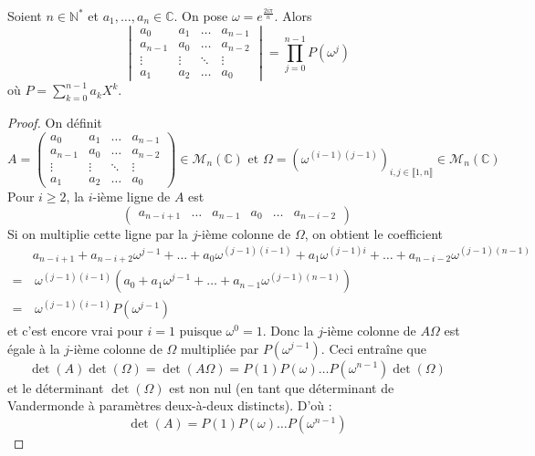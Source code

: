 






	\begin{lemma}
		\label{suite-de-polygones-1}
		Soient $n \in \mathbb{N}^*$ et $a_1, \dots, a_n \in \mathbb{C}$. On pose $\omega = e^{\frac{2i\pi}{n}}$. Alors
		\[ \begin{vmatrix} a_0 & a_1 & \dots & a_{n-1} \\ a_{n-1} & a_0 & \dots & a_{n-2}\\ \vdots & \vdots & \ddots & \vdots \\ a_1 & a_2 & \dots & a_0 \end{vmatrix} = \prod_{j=0}^{n-1} P(\omega^j) \]
		où $P = \sum_{k=0}^{n-1} a_k X^k$.
	\end{lemma}

	\begin{proof}
		On définit
		\[ A = \begin{pmatrix} a_0 & a_1 & \dots & a_{n-1} \\ a_{n-1} & a_0 & \dots & a_{n-2}\\ \vdots & \vdots & \ddots & \vdots \\ a_1 & a_2 & \dots & a_0 \end{pmatrix} \in \mathcal{M}_n(\mathbb{C}) \text{ et } \Omega = (\omega^{(i-1)(j-1)})_{i, j \in \llbracket 1, n \rrbracket} \in \mathcal{M}_n(\mathbb{C}) \]
		Pour $i \geq 2$, la $i$-ième ligne de $A$ est
		\[ \begin{pmatrix} a_{n-i+1} & \dots & a_{n-1} & a_0 & \dots & a_{n-i-2} \end{pmatrix} \]
		Si on multiplie cette ligne par la $j$-ième colonne de $\Omega$, on obtient le coefficient
		\begin{align*}
			&a_{n-i+1} + a_{n-i+2} \omega^{j-1} + \dots + a_0 \omega^{(j-1)(i-1)} + a_1 \omega^{(j-1)i} + \dots + a_{n-i-2} \omega^{(j-1)(n-1)} \\
			=& \, \omega^{(j-1)(i-1)} (a_0 + a_1 \omega^{j-1} + \dots + a_{n-1} \omega^{(j-1)(n-1)}) \\
			=& \, \omega^{(j-1)(i-1)} P(\omega^{j-1})
		\end{align*}
		et c'est encore vrai pour $i = 1$ puisque $\omega^0 = 1$. Donc la $j$-ième colonne de $A \Omega$ est égale à la $j$-ième colonne de $\Omega$ multipliée par $P(\omega^{j-1})$. Ceci entraîne que
		\[ \det(A) \det(\Omega) = \det(A\Omega) = P(1) P(\omega) \dots P(\omega^{n-1}) \det(\Omega) \]
		et le déterminant $\det(\Omega)$ est non nul (en tant que déterminant de Vandermonde à paramètres deux-à-deux distincts). D'où :
		\[ \det(A) = P(1) P(\omega) \dots P(\omega^{n-1}) \]
	\end{proof}

